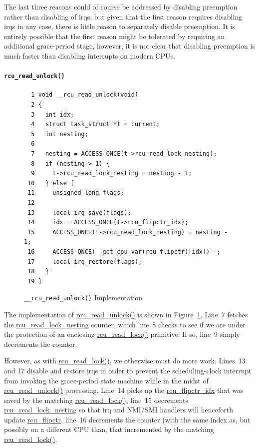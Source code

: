 The last three reasons could of course be addressed by disabling
preemption rather than disabling of irqs, but given that the first
reason requires disabling irqs in any case, there is little reason
to separately disable preemption.
It is entirely possible that the first reason might be tolerated
by requiring an additional grace-period stage, however, it is not
clear that disabling preemption is much faster than disabling
interrupts on modern CPUs.

\paragraph{{\tt rcu\_read\_unlock()}}
\label{app:rcuimpl:rcu_read_unlock()}

\begin{figure}[tbp]
{ \scriptsize
\begin{verbatim}
  1 void __rcu_read_unlock(void)
  2 {
  3   int idx;
  4   struct task_struct *t = current;
  5   int nesting;
  6
  7   nesting = ACCESS_ONCE(t->rcu_read_lock_nesting);
  8   if (nesting > 1) {
  9     t->rcu_read_lock_nesting = nesting - 1;
 10   } else {
 11     unsigned long flags;
 12
 13     local_irq_save(flags);
 14     idx = ACCESS_ONCE(t->rcu_flipctr_idx);
 15     ACCESS_ONCE(t->rcu_read_lock_nesting) = nesting - 1;
 16     ACCESS_ONCE(__get_cpu_var(rcu_flipctr)[idx])--;
 17     local_irq_restore(flags);
 18   }
 19 }
\end{verbatim}
}
\caption{{\tt \_\_rcu\_read\_unlock()} Implementation}
\label{fig:app:rcuimpl:__rcu_read_unlock() Implementation}
\end{figure}

The implementation of \url{rcu_read_unlock()} is shown in
Figure~\ref{fig:app:rcuimpl:__rcu_read_unlock() Implementation}.
Line~7 fetches the \url{rcu_read_lock_nesting} counter,
which line~8 checks to see if we are under the protection of an
enclosing \url{rcu_read_lock()} primitive.
If so, line~9 simply decrements the counter.

However, as with \url{rcu_read_lock()}, we otherwise must do
more work.
Lines~13 and 17 disable and restore irqs in order to prevent
the scheduling-clock interrupt from invoking the grace-period state machine
while in the midst of \url{rcu_read_unlock()} processing.
Line~14 picks up the \url{rcu_flipctr_idx} that was
saved by the matching \url{rcu_read_lock()},
line~15
decrements \url{rcu_read_lock_nesting} so that irq and
NMI/SMI handlers will henceforth update \url{rcu_flipctr},
line~16 decrements the counter (with the same index as, but possibly
on a different CPU than, that incremented by the matching
\url{rcu_read_lock()}.

